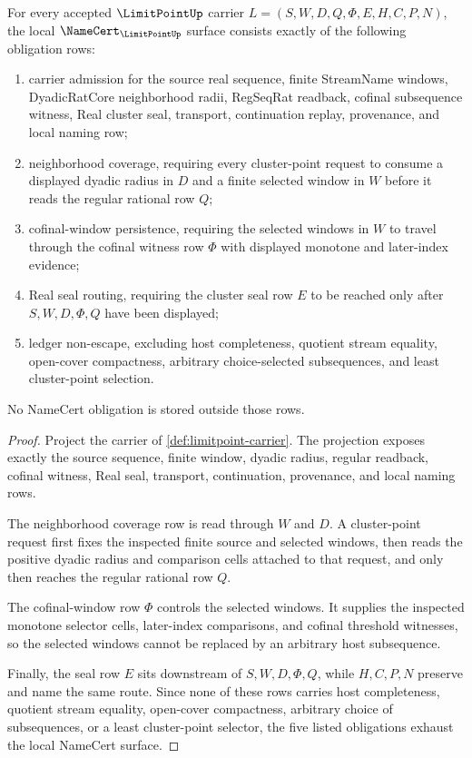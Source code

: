 \begin{theorem}
\label{thm:limitpoint-namecert-obligations}
For every accepted $\LimitPointUp$ carrier $L=(S,W,D,Q,\Phi,E,H,C,P,N)$, the local $\NameCert_{\LimitPointUp}$ surface consists exactly of the following obligation rows:
\begin{enumerate}
\item carrier admission for the source real sequence, finite StreamName windows, DyadicRatCore neighborhood radii, RegSeqRat readback, cofinal subsequence witness, Real cluster seal, transport, continuation replay, provenance, and local naming row;
\item neighborhood coverage, requiring every cluster-point request to consume a displayed dyadic radius in $D$ and a finite selected window in $W$ before it reads the regular rational row $Q$;
\item cofinal-window persistence, requiring the selected windows in $W$ to travel through the cofinal witness row $\Phi$ with displayed monotone and later-index evidence;
\item Real seal routing, requiring the cluster seal row $E$ to be reached only after $S,W,D,\Phi,Q$ have been displayed;
\item ledger non-escape, excluding host completeness, quotient stream equality, open-cover compactness, arbitrary choice-selected subsequences, and least cluster-point selection.
\end{enumerate}
No NameCert obligation is stored outside those rows.
\end{theorem}
\begin{proof}
Project the carrier of \autoref{def:limitpoint-carrier}. The projection exposes exactly the source sequence, finite window, dyadic radius, regular readback, cofinal witness, Real seal, transport, continuation, provenance, and local naming rows.

The neighborhood coverage row is read through $W$ and $D$. A cluster-point request first fixes the inspected finite source and selected windows, then reads the positive dyadic radius and comparison cells attached to that request, and only then reaches the regular rational row $Q$.

The cofinal-window row $\Phi$ controls the selected windows. It supplies the inspected monotone selector cells, later-index comparisons, and cofinal threshold witnesses, so the selected windows cannot be replaced by an arbitrary host subsequence.

Finally, the seal row $E$ sits downstream of $S,W,D,\Phi,Q$, while $H,C,P,N$ preserve and name the same route. Since none of these rows carries host completeness, quotient stream equality, open-cover compactness, arbitrary choice of subsequences, or a least cluster-point selector, the five listed obligations exhaust the local NameCert surface.
\end{proof}

